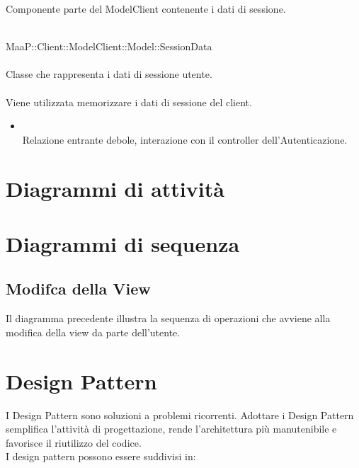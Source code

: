 Componente parte del ModelClient contenente i dati di sessione.

	\\
	MaaP::Client::ModelClient::Model::SessionData\\
	\\
	Classe che rappresenta i dati di sessione utente.\\
	\\
	Viene utilizzata memorizzare i dati di sessione del client.\\
	\begin{itemize}
	\item{}\\
	Relazione entrante debole, interazione con il controller dell'Autenticazione.
	\end{itemize}



\newpage
\section{Diagrammi di attività}



\newpage
\section{Diagrammi di sequenza}
\subsection{Modifca della View}
Il diagramma precedente illustra la sequenza di operazioni che avviene alla modifica della view da parte dell'utente.



\newpage
\section{Design Pattern}
I Design Pattern sono soluzioni a problemi ricorrenti. Adottare i Design Pattern semplifica l'attività di progettazione, rende l'architettura più manutenibile e favorisce il riutilizzo del codice.\\
I design pattern possono essere suddivisi in:

